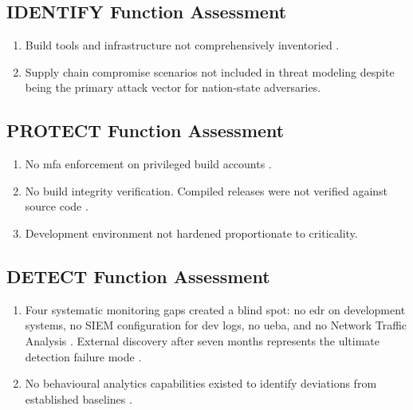 \subsection{IDENTIFY Function Assessment}
\begin{enumerate}
    \item {} Build tools and infrastructure not comprehensively inventoried \cite{us_open_2021}.
    \item {} Supply chain compromise scenarios not included in threat modeling despite being the primary attack vector for nation-state adversaries.
\end{enumerate}

\subsection{PROTECT Function Assessment}
\begin{enumerate}
    \item {} No \gls{mfa} enforcement on privileged build accounts \cite{nagle_solarwinds_2023}.
    \item {} No build integrity verification. Compiled releases were not verified against source code \cite{nagle_solarwinds_2023}.
    \item {} Development environment not hardened proportionate to criticality.
\end{enumerate}

\subsection{DETECT Function Assessment}
\begin{enumerate}
    \item {} Four systematic monitoring gaps created a blind spot: no \gls{edr} on development systems, no SIEM configuration for dev logs, no \gls{ueba}, and no Network Traffic Analysis \cite{nagle_solarwinds_2023}. External discovery after seven months represents the ultimate detection failure mode \cite{nelson_incident_2025}.
    \item {} No behavioural analytics capabilities existed to identify deviations from established baselines \cite{nelson_incident_2025}.
\end{enumerate}
